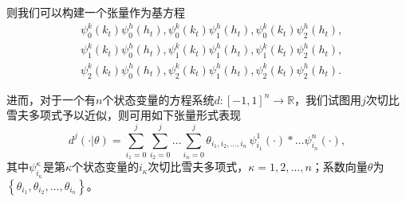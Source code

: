 则我们可以构建一个张量作为基方程
\begin{equation*}
  \begin{split}
    &\psi_{0}^{k}(k_t) \psi_{0}^{h}(h_t),
    \psi_{0}^{k}(k_t) \psi_{1}^{h}(h_t),
    \psi_{0}^{k}(k_t) \psi_{2}^{h}(h_t), \\
    &\psi_{1}^{k}(k_t) \psi_{0}^{h}(h_t),
    \psi_{1}^{k}(k_t) \psi_{1}^{h}(h_t),
    \psi_{1}^{k}(k_t) \psi_{2}^{h}(h_t), \\
    &\psi_{2}^{k}(k_t) \psi_{0}^{h}(h_t),
    \psi_{2}^{k}(k_t) \psi_{1}^{h}(h_t),
    \psi_{2}^{k}(k_t) \psi_{2}^{h}(h_t).
  \end{split}
\end{equation*}

进而，对于一个有$n$个状态变量的方程系统$d:[-1,1]^n \rightarrow \mathbb{R}$，我们试图用$j$次切比雪夫多项式予以近似，则可用如下张量形式表现
\begin{equation*}
  d^j(\cdot | \theta) = \sum_{i_1 = 0}^{j} \sum_{i_2 = 0}^{j} \ldots \sum_{i_n = 0}^{j} \theta_{i_1, i_2, \ldots, i_n} \, \psi_{i_1}^{1}(\cdot) * \ldots  \psi_{i_n}^{n}(\cdot),
\end{equation*}
其中$\psi_{i_\kappa}^{\kappa}$是第$\kappa$个状态变量的$i_{\kappa}$次切比雪夫多项式，$\kappa = 1,2,\ldots,n$；系数向量$\theta$为$\left\{ \theta_{i_1}, \theta_{i_2}, \ldots, \theta_{i_n} \right\}$。

